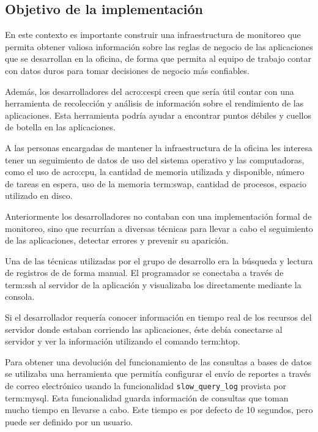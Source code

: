 \subsection{Objetivo de la implementación}
\label{objetivos_de_la_implementacion}

En este contexto es importante construir una infraestructura de monitoreo que
permita obtener valiosa información sobre las reglas de negocio de las
aplicaciones que se desarrollan en la oficina, de forma que permita al equipo
de trabajo contar con datos duros para tomar decisiones de negocio más
confiables.

Además, los desarrolladores del \gls{acro:cespi} creen que sería útil contar
con una herramienta de recolección y análisis de información sobre el
rendimiento de las aplicaciones. Esta herramienta podría ayudar a encontrar
puntos débiles y cuellos de botella en las aplicaciones.

A las personas encargadas de mantener la infraestructura de la oficina les
interesa tener un seguimiento de datos de uso del sistema operativo y las
computadoras, como el uso de \gls{acro:cpu}, la cantidad de memoria utilizada y
disponible, número de tareas en espera, uso de la memoria \gls{term:swap},
cantidad de procesos, espacio utilizado en disco.

Anteriormente los desarrolladores no contaban con una implementación formal de
monitoreo, sino que recurrían a diversas técnicas para llevar a cabo el
seguimiento de las aplicaciones, detectar errores y prevenir su aparición.

Una de las técnicas utilizadas por el grupo de desarrollo era la búsqueda y
lectura de registros de  de forma manual. El programador se conectaba
a través de \gls{term:ssh} al servidor de la aplicación y visualizaba los
 directamente mediante la consola.

Si el desarrollador requería conocer información en tiempo real de los recursos
del servidor donde estaban corriendo las aplicaciones, éste debía conectarse al
servidor y ver la información utilizando el comando \gls{term:htop}.

Para obtener una devolución del funcionamiento de las consultas a bases de
datos se utilizaba una herramienta que permitía configurar el envío de reportes
a través de correo electrónico usando la funcionalidad
\texttt{slow\_query\_log} provista por \gls{term:mysql}. Esta funcionalidad
guarda información de consultas que toman mucho tiempo en llevarse a cabo. Este
tiempo es por defecto de 10 segundos, pero puede ser definido por un usuario.

